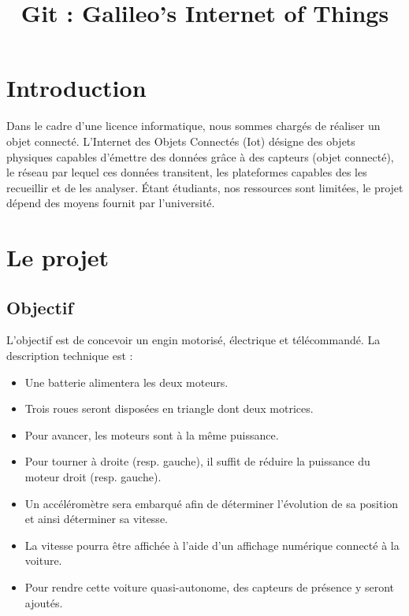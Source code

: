 \documentclass[conference]{IEEEtran}
\begin{document}
\title{Git : Galileo's Internet of Things
}

\author{

}

\maketitle

\section{Introduction}
    Dans le cadre d'une licence informatique, nous sommes chargés de réaliser un objet connecté. L'Internet des Objets Connectés (Iot) désigne des objets physiques capables d'émettre des données grâce à des capteurs (objet connecté), le réseau par lequel ces données transitent, les plateformes capables des les recueillir et de les analyser. Étant étudiants, nos ressources sont limitées, le projet dépend des moyens fournit par l'université.
    
\section{Le projet}
\subsection{Objectif}
L'objectif est de concevoir un engin motorisé, électrique et télécommandé.\newline 
La description technique est :
\begin{itemize}
    \item Une batterie alimentera les deux moteurs.
    \item Trois roues seront disposées en triangle dont deux motrices.
    \item Pour avancer, les moteurs sont à la même puissance.
    \item Pour tourner à droite (resp. gauche), il suffit de réduire la puissance du moteur droit (resp. gauche).
    \item  Un accéléromètre sera embarqué afin de déterminer l'évolution de sa position et ainsi déterminer sa vitesse.
    \item La vitesse pourra être affichée à l'aide d'un affichage numérique connecté à la voiture.
    \item Pour rendre cette voiture quasi-autonome, des capteurs de présence y seront ajoutés.
\end{itemize}
\end{document}
